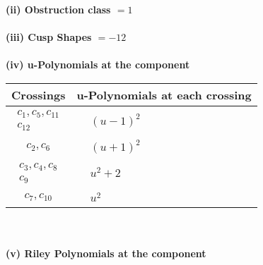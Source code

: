 \documentclass[1p]{elsarticle_modified}
\theoremstyle{definition}
\begin{document}
\flushleft \textbf{(ii) Obstruction class $= 1$}\\~\\
\flushleft \textbf{(iii) Cusp Shapes $= -12$}\\~\\
\newpage\renewcommand{\arraystretch}{1}
\flushleft \textbf{(iv) u-Polynomials at the component}\newline \\
\begin{tabular}{m{50pt}|m{274pt}}
Crossings & \hspace{64pt}u-Polynomials at each crossing \\
\hline $$\begin{aligned}c_{1},c_{5},c_{11}\\c_{12}\end{aligned}$$&$\begin{aligned}
&(u-1)^2
\end{aligned}$\\
\hline $$\begin{aligned}c_{2},c_{6}\end{aligned}$$&$\begin{aligned}
&(u+1)^2
\end{aligned}$\\
\hline $$\begin{aligned}c_{3},c_{4},c_{8}\\c_{9}\end{aligned}$$&$\begin{aligned}
&u^2+2
\end{aligned}$\\
\hline $$\begin{aligned}c_{7},c_{10}\end{aligned}$$&$\begin{aligned}
&u^2
\end{aligned}$\\
\hline
\end{tabular}\\~\\
\newpage\renewcommand{\arraystretch}{1}
\flushleft \textbf{(v) Riley Polynomials at the component}\newline \\
\end{document}
